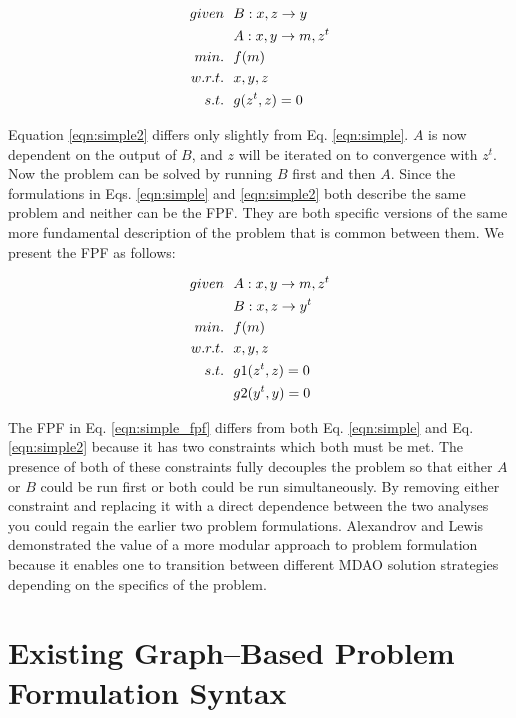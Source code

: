     \begin{align}
        given & \ \ B: {x,z} \rightarrow {y} \notag
        \\      & \ \ A: {x,y} \rightarrow {m,z^t} \notag
        \\min. &\ \ f(m) \notag
        \\w.r.t. & \ \ x,y,z \notag
        \\s.t. & \ \ g(z^t,z) = 0
        \label{eqn:simple2}
    \end{align}

    Equation \ref{eqn:simple2} differs only slightly from Eq. \ref{eqn:simple}. $A$ is now dependent on the output of $B$, 
    and $z$ will be iterated on to convergence with $z^t$. Now the problem can be solved by running $B$ first and then $A$.
    Since the formulations in Eqs. \ref{eqn:simple} and \ref{eqn:simple2} both describe the same problem and neither can be the
    FPF. They are both specific versions of the same more fundamental description of 
    the problem that is common between them. We present the FPF as follows: 

    \begin{align}
        given & \ \ A: {x,y} \rightarrow {m,z^t} \notag
        \\      & \ \ B: {x,z} \rightarrow {y^t} \notag
        \\min. &\ \ f(m) \notag
        \\w.r.t. & \ \ x,y,z \notag
        \\s.t. & \ \ g1(z^t,z) = 0 \notag
        \\     & \ \ g2(y^t,y) = 0
        \label{eqn:simple_fpf}
    \end{align}

    The FPF in Eq. \ref{eqn:simple_fpf} differs from both Eq. \ref{eqn:simple} and Eq. \ref{eqn:simple2} because it has 
    two constraints which both must be met. The presence of both of these constraints fully decouples the problem so that 
    either $A$ or $B$ could be run first or both could be run simultaneously. By removing either constraint and replacing 
    it with a direct dependence between the two analyses you could regain the earlier two problem formulations. Alexandrov
    and Lewis demonstrated the value of a more modular approach to problem formulation because it enables one to transition between different 
    MDAO solution strategies depending on the specifics of the problem\cite{Alex2000}.


\section{Existing Graph--Based Problem Formulation Syntax}

